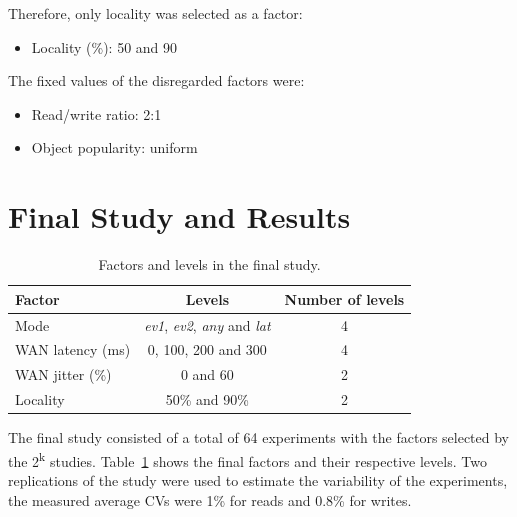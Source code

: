 \documentclass[man,floatsintext,12pt]{apa6}
\begin{document}
Therefore, only locality was selected as a factor:

\begin{itemize}

\item Locality (\%): 50 and 90

\end{itemize}

The fixed values of the disregarded factors were:

\begin{itemize}

\item Read/write ratio: 2:1

\item Object popularity: uniform

\end{itemize}

\section{Final Study and Results}

\begin{table}[h!]
\caption{Factors and levels in the final study.}
\begin{tabular}{lcc} \toprule

Factor & Levels & Number of levels\\ \midrule

Mode & \textit{ev1}, \textit{ev2}, \textit{any} and \textit{lat} & 4\\

WAN latency (ms) & 0, 100, 200 and 300 & 4\\

WAN jitter (\%) & 0 and 60 & 2\\

Locality & 50\% and 90\% & 2\\ \bottomrule

\end{tabular}

\label{tab:fatores_e_niveis_do_estudo_final}

\end{table}

The final study consisted of a total of 64 experiments with the factors
selected by the 2\textsuperscript{k} studies.
Table~\ref{tab:fatores_e_niveis_do_estudo_final} shows the final factors and
their respective levels. Two replications of the study were used to estimate
the variability of the experiments, the measured average CVs were 1\% for reads
and 0.8\% for writes.
\end{document}
